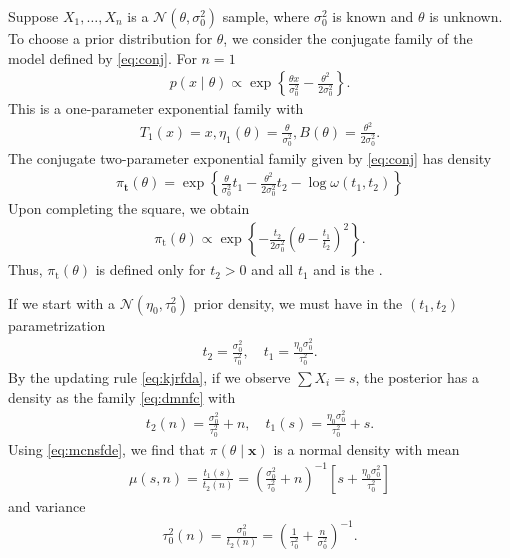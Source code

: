 \documentclass{article}
\begin{document}
\begin{exma}
  Suppose $X_{1}, \ldots, X_{n}$ is a $\mathcal{N}\left(\theta, \sigma_{0}^{2}\right)$ sample, where $\sigma_{0}^{2}$ is known and $\theta$ is unknown. To choose a prior distribution for $\theta$, we consider the conjugate family of the model defined by \cref{eq:conj}. For $n=1$
\begin{align*}
p(x \mid \theta) \propto \exp \left\{\frac{\theta x}{\sigma_{0}^{2}}-\frac{\theta^{2}}{2 \sigma_{0}^{2}}\right\} .
\end{align*}
This is a one-parameter exponential family with
\begin{align*}
T_{1}(x)=x, \eta_{1}(\theta)=\frac{\theta}{\sigma_{0}^{2}}, B(\theta)=\frac{\theta^{2}}{2 \sigma_{0}^{2}} .
\end{align*}
The conjugate two-parameter exponential family given by \cref{eq:conj} has density
\begin{align}
\pi_{\mathbf{t}}(\theta)=\exp \left\{\frac{\theta}{\sigma_{0}^{2}} t_{1}-\frac{\theta^{2}}{2 \sigma_{0}^{2}} t_{2}-\log \omega\left(t_{1}, t_{2}\right)\right\} \label{eq:dmnfc}
\end{align}
Upon completing the square, we obtain
\begin{align}
\pi_{\mathrm{t}}(\theta) \propto \exp \left\{-\frac{t_{2}}{2 \sigma_{0}^{2}}\left(\theta-\frac{t_{1}}{t_{2}}\right)^{2}\right\} \label{eq:mcnsfde}.
\end{align}
Thus, $\pi_{\mathrm{t}}(\theta)$ is defined only for $t_{2}>0$ and all $t_{1}$ and is the . 



If we start with a $\mathcal{N}\left(\eta_{0}, \tau_{0}^{2}\right)$ prior density, we must have in the $\left(t_{1}, t_{2}\right)$ parametrization
\begin{align*}
t_{2}=\frac{\sigma_{0}^{2}}{\tau_{0}^{2}}, \quad t_{1}=\frac{\eta_{0} \sigma_{0}^{2}}{\tau_{0}^{2}} .
\end{align*}
By the updating rule \cref{eq:kjrfda}, if we observe $\sum X_{i}=s$, the posterior has a density as the family \cref{eq:dmnfc} with
\begin{align*}
t_{2}(n)=\frac{\sigma_{0}^{2}}{\tau_{0}^{2}}+n, \quad t_{1}(s)=\frac{\eta_{0} \sigma_{0}^{2}}{\tau_{0}^{2}}+s .
\end{align*}
Using \cref{eq:mcnsfde}, we find that $\pi(\theta \mid \mathbf{x})$ is a normal density with mean
\begin{align*}
\mu(s, n)=\frac{t_{1}(s)}{t_{2}(n)}=\left(\frac{\sigma_{0}^{2}}{\tau_{0}^{2}}+n\right)^{-1}\left[s+\frac{\eta_{0} \sigma_{0}^{2}}{\tau_{0}^{2}}\right]
\end{align*}
and variance
\begin{align*}
\tau_{0}^{2}(n)=\frac{\sigma_{0}^{2}}{t_{2}(n)}=\left(\frac{1}{\tau_{0}^{2}}+\frac{n}{\sigma_{0}^{2}}\right)^{-1} .
\end{align*}
\end{exma}





\end{document}
